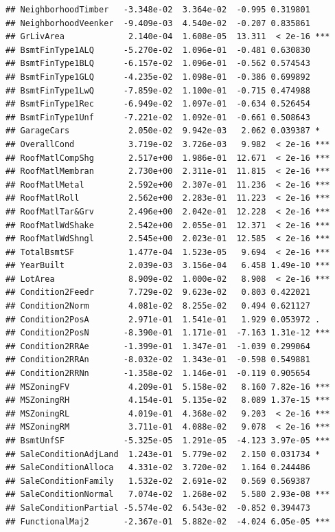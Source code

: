 \documentclass[american,]{article}
\theoremstyle{definition}
\theoremstyle{definition}
\theoremstyle{definition}
\theoremstyle{remark}
\begin{document}
\begin{verbatim}
## NeighborhoodTimber   -3.348e-02  3.364e-02  -0.995 0.319801    
## NeighborhoodVeenker  -9.409e-03  4.540e-02  -0.207 0.835861    
## GrLivArea             2.140e-04  1.608e-05  13.311  < 2e-16 ***
## BsmtFinType1ALQ      -5.270e-02  1.096e-01  -0.481 0.630830    
## BsmtFinType1BLQ      -6.157e-02  1.096e-01  -0.562 0.574543    
## BsmtFinType1GLQ      -4.235e-02  1.098e-01  -0.386 0.699892    
## BsmtFinType1LwQ      -7.859e-02  1.100e-01  -0.715 0.474988    
## BsmtFinType1Rec      -6.949e-02  1.097e-01  -0.634 0.526454    
## BsmtFinType1Unf      -7.221e-02  1.092e-01  -0.661 0.508643    
## GarageCars            2.050e-02  9.942e-03   2.062 0.039387 *  
## OverallCond           3.719e-02  3.726e-03   9.982  < 2e-16 ***
## RoofMatlCompShg       2.517e+00  1.986e-01  12.671  < 2e-16 ***
## RoofMatlMembran       2.730e+00  2.311e-01  11.815  < 2e-16 ***
## RoofMatlMetal         2.592e+00  2.307e-01  11.236  < 2e-16 ***
## RoofMatlRoll          2.562e+00  2.283e-01  11.223  < 2e-16 ***
## RoofMatlTar&Grv       2.496e+00  2.042e-01  12.228  < 2e-16 ***
## RoofMatlWdShake       2.542e+00  2.055e-01  12.371  < 2e-16 ***
## RoofMatlWdShngl       2.545e+00  2.023e-01  12.585  < 2e-16 ***
## TotalBsmtSF           1.477e-04  1.523e-05   9.694  < 2e-16 ***
## YearBuilt             2.039e-03  3.156e-04   6.458 1.49e-10 ***
## LotArea               8.909e-02  1.000e-02   8.908  < 2e-16 ***
## Condition2Feedr       7.729e-02  9.623e-02   0.803 0.422021    
## Condition2Norm        4.081e-02  8.255e-02   0.494 0.621127    
## Condition2PosA        2.971e-01  1.541e-01   1.929 0.053972 .  
## Condition2PosN       -8.390e-01  1.171e-01  -7.163 1.31e-12 ***
## Condition2RRAe       -1.399e-01  1.347e-01  -1.039 0.299064    
## Condition2RRAn       -8.032e-02  1.343e-01  -0.598 0.549881    
## Condition2RRNn       -1.358e-02  1.146e-01  -0.119 0.905654    
## MSZoningFV            4.209e-01  5.158e-02   8.160 7.82e-16 ***
## MSZoningRH            4.154e-01  5.135e-02   8.089 1.37e-15 ***
## MSZoningRL            4.019e-01  4.368e-02   9.203  < 2e-16 ***
## MSZoningRM            3.711e-01  4.088e-02   9.078  < 2e-16 ***
## BsmtUnfSF            -5.325e-05  1.291e-05  -4.123 3.97e-05 ***
## SaleConditionAdjLand  1.243e-01  5.779e-02   2.150 0.031734 *  
## SaleConditionAlloca   4.331e-02  3.720e-02   1.164 0.244486    
## SaleConditionFamily   1.532e-02  2.691e-02   0.569 0.569387    
## SaleConditionNormal   7.074e-02  1.268e-02   5.580 2.93e-08 ***
## SaleConditionPartial -5.574e-02  6.543e-02  -0.852 0.394473    
## FunctionalMaj2       -2.367e-01  5.882e-02  -4.024 6.05e-05 ***

\end{verbatim}
\end{document}

